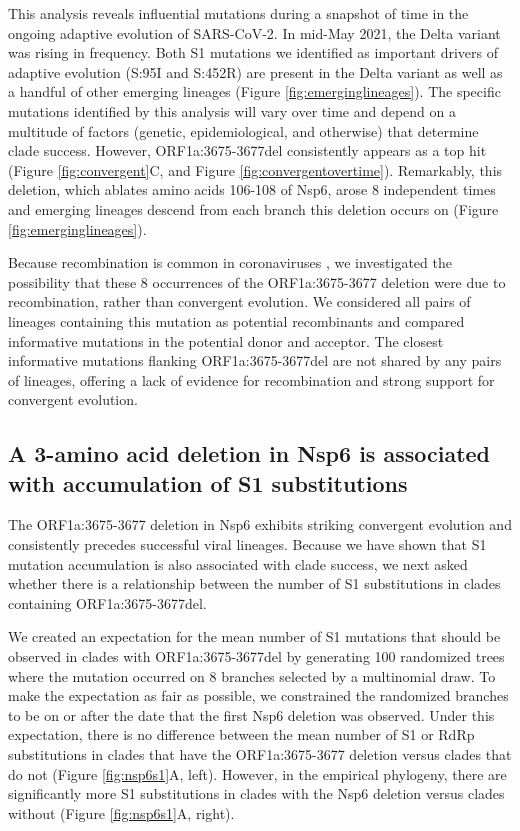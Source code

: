 \documentclass[11pt,oneside,letterpaper]{article}
\begin{document}
This analysis reveals influential mutations during a snapshot of time in the ongoing adaptive evolution of SARS-CoV-2.
In mid-May 2021, the Delta variant was rising in frequency.
Both S1 mutations we identified as important drivers of adaptive evolution (S:95I and S:452R) are present in the Delta variant as well as a handful of other emerging lineages (Figure \ref{fig:emerginglineages}).
The specific mutations identified by this analysis will vary over time and depend on a multitude of factors (genetic, epidemiological, and otherwise) that determine clade success.
However, ORF1a:3675-3677del consistently appears as a top hit (Figure \ref{fig:convergent}C, and Figure \ref{fig:convergentovertime}).
Remarkably, this deletion, which ablates amino acids 106-108 of Nsp6, arose 8 independent times and emerging lineages descend from each branch this deletion occurs on (Figure \ref{fig:emerginglineages}).

Because recombination is common in coronaviruses \cite{Muller2021-qq, Turkahia2021-ao}, we investigated the possibility that these 8 occurrences of the ORF1a:3675-3677 deletion were due to recombination, rather than convergent evolution.
We considered all pairs of lineages containing this mutation as potential recombinants and compared informative mutations in the potential donor and acceptor.
The closest informative mutations flanking ORF1a:3675-3677del are not shared by any pairs of lineages, offering a lack of evidence for recombination and strong support for convergent evolution.

\subsection*{A 3-amino acid deletion in Nsp6 is associated with accumulation of S1 substitutions}
The ORF1a:3675-3677 deletion in Nsp6 exhibits striking convergent evolution and consistently precedes successful viral lineages. Because we have shown that S1 mutation accumulation is also associated with clade success, we next asked whether there is a relationship between the number of S1 substitutions in clades containing ORF1a:3675-3677del.

We created an expectation for the mean number of S1 mutations that should be observed in clades with ORF1a:3675-3677del by generating 100 randomized trees where the mutation occurred on 8 branches selected by a multinomial draw.
To make the expectation as fair as possible, we constrained the randomized branches to be on or after the date that the first Nsp6 deletion was observed.
Under this expectation, there is no difference between the mean number of S1 or RdRp substitutions in clades that have the ORF1a:3675-3677 deletion versus clades that do not (Figure \ref{fig:nsp6s1}A, left).
However, in the empirical phylogeny, there are significantly more S1 substitutions in clades with the Nsp6 deletion versus clades without (Figure \ref{fig:nsp6s1}A, right).
\end{document}
